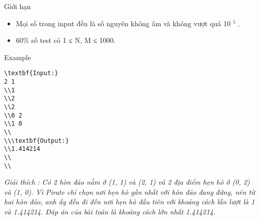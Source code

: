 Giới hạn
\begin{itemize}
	\item     Mọi số trong input đều là số nguyên không âm và không vượt quá 10    $^     5    $    .   
	\item     60\% số test có 1 ≤ N, M ≤ 1000.   
\end{itemize}
Example
\begin{verbatim}
\textbf{Input:}
2 1 
\\1 
\\2
\\2
\\0 2
\\1 0
\\
\\\textbf{Output:}
\\1.414214
\\
\\\end{verbatim}



\emph{     Giải thích        : Có 2 hòn đảo nằm ở (1, 1) và (2, 1) và 2 địa điểm hẹn hò ở (0, 2) và (1, 0). Vì Pirate chỉ chọn nơi hẹn hò gần nhất với hòn đảo đang đứng, nên từ hai hòn đảo, anh ấy đều đi đến nơi hẹn hò đầu tiên với khoảng cách lần lượt là 1 và 1.414214. Đáp án của bài toán là khoảng cách lớn nhất 1.414214.    
\\}